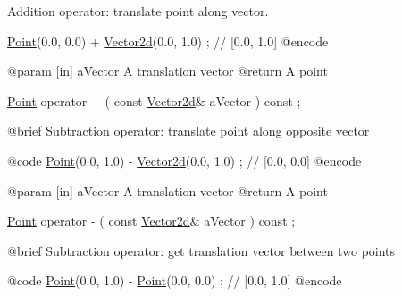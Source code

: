 Addition operator\+: translate point along vector. 


\begin{DoxyCode}
                        \hyperlink{classlibrary_1_1math_1_1geom_1_1d2_1_1objects_1_1_point_a4998aefdf80bdfd967f21d49fa050398}{Point}(0.0, 0.0) + \hyperlink{namespacelibrary_1_1math_1_1obj_a2fa27512c4f4b07db35d602cfdd2c293}{Vector2d}(0.0, 1.0) ; \textcolor{comment}{// [0.0, 1.0]}
    @encode
   
    @param              [in] aVector A translation vector
    @\textcolor{keywordflow}{return}             A point

\hyperlink{classlibrary_1_1math_1_1geom_1_1d2_1_1objects_1_1_point_a4998aefdf80bdfd967f21d49fa050398}{Point}                   operator +                                  (   \textcolor{keyword}{const}   
      \hyperlink{namespacelibrary_1_1math_1_1obj_a2fa27512c4f4b07db35d602cfdd2c293}{Vector2d}&                   aVector                                     ) \textcolor{keyword}{const} ;

    @brief              Subtraction \textcolor{keyword}{operator}: translate point along opposite vector
   
    @code
                        \hyperlink{classlibrary_1_1math_1_1geom_1_1d2_1_1objects_1_1_point_a4998aefdf80bdfd967f21d49fa050398}{Point}(0.0, 1.0) - \hyperlink{namespacelibrary_1_1math_1_1obj_a2fa27512c4f4b07db35d602cfdd2c293}{Vector2d}(0.0, 1.0) ; \textcolor{comment}{// [0.0, 0.0]}
    @encode
   
    @param              [in] aVector A translation vector
    @\textcolor{keywordflow}{return}             A point

\hyperlink{classlibrary_1_1math_1_1geom_1_1d2_1_1objects_1_1_point_a4998aefdf80bdfd967f21d49fa050398}{Point}                   operator -                                  (   \textcolor{keyword}{const}   
      \hyperlink{namespacelibrary_1_1math_1_1obj_a2fa27512c4f4b07db35d602cfdd2c293}{Vector2d}&                   aVector                                     ) \textcolor{keyword}{const} ;

    @brief              Subtraction \textcolor{keyword}{operator}: \textcolor{keyword}{get} translation vector between two points
   
    @code
                        \hyperlink{classlibrary_1_1math_1_1geom_1_1d2_1_1objects_1_1_point_a4998aefdf80bdfd967f21d49fa050398}{Point}(0.0, 1.0) - \hyperlink{classlibrary_1_1math_1_1geom_1_1d2_1_1objects_1_1_point_a4998aefdf80bdfd967f21d49fa050398}{Point}(0.0, 0.0)  ; \textcolor{comment}{// [0.0, 1.0]}
    @encode
   

\end{DoxyCode}

